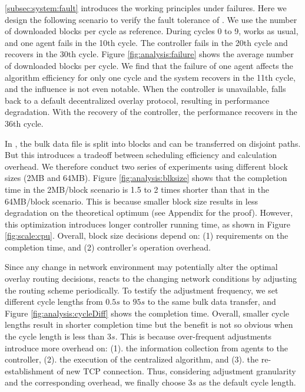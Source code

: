 \label{subsubsec:evaluation:adaptability}

 \Section\ref{subsec:system:fault} introduces the working principles under failures. Here we design the following scenario to verify the fault tolerance of \name. We use the number of downloaded blocks per cycle as reference. During cycles 0 to 9, \name works as usual, and one agent fails in the 10th cycle. The controller fails in the 20th cycle and recovers in the 30th cycle. Figure \ref{fig:analysis:failure} shows the average number of downloaded blocks per cycle. We find that the failure of one agent affects the algorithm efficiency for only one cycle and the system recovers in the 11th cycle, and the influence is not even notable. When the controller is unavailable, \name falls back to a default decentralized overlay protocol, resulting in performance degradation. With the recovery of the controller, the performance recovers in the 36th cycle.

 In \name, the bulk data file is split into blocks and can be transferred on disjoint paths. But this introduces a tradeoff between scheduling efficiency and calculation overhead. We therefore conduct two series of experiments using different block sizes (2MB and 64MB). Figure \ref{fig:analysis:blksize} shows that the completion time in the 2MB/block scenario is 1.5 to 2 times shorter than that in the 64MB/block scenario. This is because smaller block size results in less degradation on the theoretical optimum (see Appendix for the proof). However, this optimization introduces longer controller running time, as shown in Figure \ref{fig:scale:cpu}. Overall, block size decisions depend on: (1) requirements on the completion time, and (2) controller's operation overhead.

 Since any change in network environment may potentially alter the optimal overlay routing decisions, \name reacts to the changing network conditions by adjusting the routing scheme periodically. To testify the adjustment frequency, we set different cycle lengths from $0.5s$ to $95s$ to the same bulk data transfer, and Figure \ref{fig:analysis:cycleDiff} shows the completion time. Overall, smaller cycle lengths result in shorter completion time but the benefit is not so obvious when the cycle length is less than $3s$. This is because over-frequent adjustments introduce more overhead on: (1). the information collection from agents to the controller, (2). the execution of the centralized algorithm, and (3). the re-establishment of new TCP connection. Thus, considering adjustment granularity and the corresponding overhead, we finally choose $3s$ as the default cycle length.


